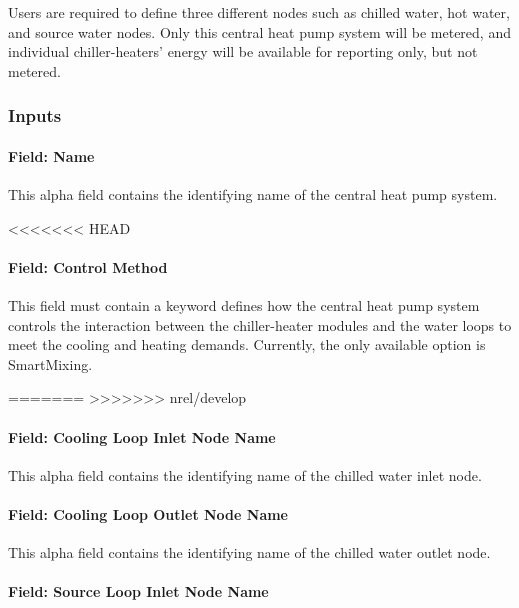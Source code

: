 Users are required to define three different nodes such as chilled water, hot water, and source water nodes. Only this central heat pump system will be metered, and individual chiller-heaters' energy will be available for reporting only, but not metered.

\subsubsection{Inputs}\label{inputs-19-004}

\paragraph{Field: Name}\label{field-name-18-005}

This alpha field contains the identifying name of the central heat pump system.

<<<<<<< HEAD
\paragraph{Field: Control Method}\label{field-control-method}

This field must contain a keyword defines how the central heat pump system controls the interaction between the chiller-heater modules and the water loops to meet the cooling and heating demands. Currently, the only available option is SmartMixing.

=======
>>>>>>> nrel/develop
\paragraph{Field: Cooling Loop Inlet Node Name}\label{field-cooling-loop-inlet-node-name}

This alpha field contains the identifying name of the chilled water inlet node.

\paragraph{Field: Cooling Loop Outlet Node Name}\label{field-cooling-loop-outlet-node-name}

This alpha field contains the identifying name of the chilled water outlet node.

\paragraph{Field: Source Loop Inlet Node Name}\label{field-source-loop-inlet-node-name}

